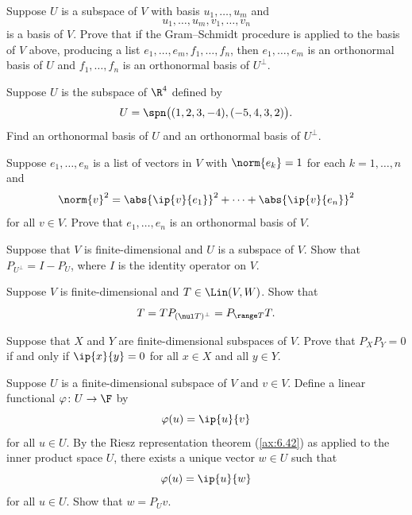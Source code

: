 \begin{exercise}
Suppose $U$ is a subspace of $V$ with basis $u_1,\dots,u_m$ and
\[ u_1,\dots,u_m,v_1,\dots,v_n \]
is a basis of $V$. Prove that if the Gram--Schmidt procedure is applied to the
basis of $V$ above, producing a list $e_1,\dots,e_m,f_1,\dots,f_n$, then
$e_1,\dots,e_m$ is an orthonormal basis of $U$ and $f_1,\dots,f_n$ is an
orthonormal basis of $U^\perp$.
\end{exercise}

\begin{exercise}
Suppose $U$ is the subspace of $\R^4$ defined by
\[ U = \spn\bigl((1,2,3,-4),(-5,4,3,2)\bigr). \]
Find an orthonormal basis of $U$ and an orthonormal basis of $U^\perp$.
\end{exercise}

\begin{exercise}
Suppose $e_1,\dots,e_n$ is a list of vectors in $V$ with $\norm{e_k}=1$ for each
$k=1,\dots,n$ and
\[ \norm{v}^2 = \abs{\ip{v}{e_1}}^2+\cdots+\abs{\ip{v}{e_n}}^2 \]
for all $v\in V$. Prove that $e_1,\dots,e_n$ is an orthonormal basis of $V$.
\end{exercise}

\begin{exercise}
Suppose that $V$ is finite-dimensional and $U$ is a subspace of $V$. Show that
$P_{U^\perp}=I-P_U$, where $I$ is the identity operator on $V$.
\end{exercise}

\begin{exercise}
Suppose $V$ is finite-dimensional and $T\in\Lin(V,W)$. Show that
\[ T = TP_{(\nul T)^\perp} = P_{\range T}T. \]
\end{exercise}

\begin{exercise}
Suppose that $X$ and $Y$ are finite-dimensional subspaces of $V$. Prove that
$P_XP_Y=0$ if and only if $\ip{x}{y}=0$ for all $x\in X$ and all $y\in Y$.
\end{exercise}

\begin{exercise}
Suppose $U$ is a finite-dimensional subspace of $V$ and $v\in V$. Define a
linear functional $\varphi\colon U\to\F$ by
\[ \varphi(u) = \ip{u}{v} \]
for all $u\in U$. By the Riesz representation theorem (\ref{ax:6.42}) as
applied to the inner product space $U$, there exists a unique vector $w\in U$
such that
\[ \varphi(u) = \ip{u}{w} \]
for all $u\in U$. Show that $w=P_Uv$.
\end{exercise}

